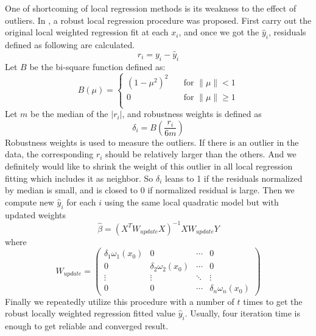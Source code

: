 One of shortcoming of local regression methods is its weakness to the effect of 
outliers. In \cite{Cleveland:1979}, a robust local regression procedure was 
proposed. First carry out the original local weighted regression fit at each 
$x_i$, and once we got the $\hat y_i$, residuals defined as following are 
calculated.
\begin{equation}
r_i = y_i - \hat y_i
\end{equation}
Let $B$ be the bi-square function defined as:
\begin{equation} 
\label{bisquare}
B(\mu) =
  \begin{cases}
    (1 - \mu^2)^2      & \quad \text{for } \|\mu\| < 1\\
    0  & \quad \text{for } \|\mu\| \ge 1\\
  \end{cases}
\end{equation}
Let $m$ be the median of the $|r_i|$, and robustness weights is defined as
\begin{equation}
\delta_i = B\left(\frac{r_i}{6m}\right)
\end{equation}
Robustness weights is used to measure the outliers. If there is an outlier in 
the data, the corresponding $r_i$ should be relatively larger than the others.
And we definitely would like to shrink the weight of this outlier in all local
regression fitting which includes it as neighbor. So $\delta_i$ leans to 1
if the residuals normalized by median is small, and is closed to 0 if normalized
residual is large. Then we compute new $\hat y_i$ for each $i$ using the same
local quadratic model but with updated weights
\begin{equation}
\hat \beta = (X^TW_{update}X)^{-1}XW_{update}Y
\end{equation}
where
\begin{equation}
W_{update} =  
\begin{pmatrix}
  \delta_1\omega_1(x_0) & 0 & \cdots & 0 \\
  0 & \delta_2\omega_2(x_0) & \cdots & 0 \\
  \vdots  & \vdots & \ddots & \vdots  \\
  0 & 0 & \cdots & \delta_n\omega_n(x_0) 
\end{pmatrix}
\end{equation}
Finally we repeatedly utilize this procedure with a number of $t$ times to get
the robust locally weighted regression fitted value $\hat y_i$. Usually, four
iteration time is enough to get reliable and converged result.

